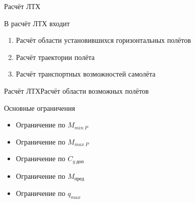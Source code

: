 \begin{frame}{Расчёт ЛТХ}
\begin{block}{В расчёт ЛТХ входит}
   \begin{enumerate}
    \item Расчёт области установившихся горизонтальных полётов  
    \item Расчёт траектории полёта 
    \item Расчёт транспортных возможностей самолёта
   \end{enumerate}
\end{block}
\end{frame}

\begin{frame}{Расчёт ЛТХ}{Расчёт области возможных полётов}

    \begin{block}{Основные ограничения}
        \begin{itemize}
            \item Ограничение по $M_{min \ P}$ 
            \item Ограничение по $M_{max \ P}$
            \item Ограничение по $C_{y \ \text{доп}}$
            \item Ограничение по $M_\text{пред}$
            \item Ограничение по $q_{max}$
        \end{itemize}
    \end{block}

\end{frame}

